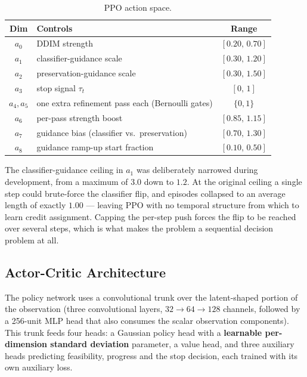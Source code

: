 \begin{table}[h]
\centering
\caption[PPO action space]{PPO action space.}
\label{tab:actions}
\begin{tabular}{@{}clc@{}}
\toprule
\textbf{Dim} & \textbf{Controls} & \textbf{Range} \\
\midrule
$a_0$ & DDIM strength                                  & $[0.20,\,0.70]$ \\
$a_1$ & classifier-guidance scale                      & $[0.30,\,1.20]$ \\
$a_2$ & preservation-guidance scale                    & $[0.30,\,1.50]$ \\
$a_3$ & stop signal $\tau_t$                           & $[0,\,1]$ \\
$a_4, a_5$ & one extra refinement pass each (Bernoulli gates) & $\{0,1\}$ \\
$a_6$ & per-pass strength boost                        & $[0.85,\,1.15]$ \\
$a_7$ & guidance bias (classifier vs.\ preservation)   & $[0.70,\,1.30]$ \\
$a_8$ & guidance ramp-up start fraction                & $[0.10,\,0.50]$ \\
\bottomrule
\end{tabular}
\end{table}

The classifier-guidance ceiling in $a_1$ was deliberately narrowed during
development, from a maximum of $3.0$ down to $1.2$. At the original
ceiling a single step could brute-force the classifier flip, and episodes
collapsed to an average length of exactly $1.00$ --- leaving PPO with no
temporal structure from which to learn credit assignment. Capping the
per-step push forces the flip to be reached over several steps, which is
what makes the problem a sequential decision problem at all.

\subsection{Actor-Critic Architecture}

The policy network uses a convolutional trunk over the latent-shaped
portion of the observation (three convolutional layers, $32\to64\to128$
channels, followed by a 256-unit MLP head that also consumes the scalar
observation components). This trunk feeds four heads: a Gaussian policy
head with a \textbf{learnable per-dimension standard deviation}
parameter, a value head, and three auxiliary heads predicting
feasibility, progress and the stop decision, each trained with its own
auxiliary loss.

